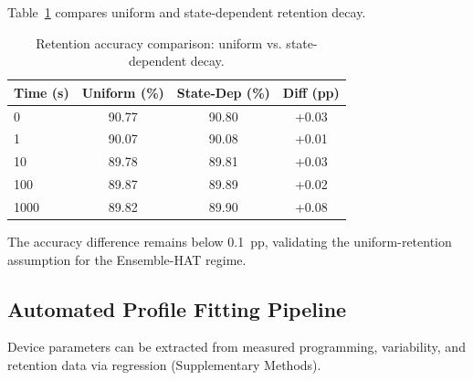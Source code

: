 Table~\ref{deprecated-tab:retention-comparison} compares uniform and state-dependent retention decay.

\begin{table}[ht]
\centering
\caption{Retention accuracy comparison: uniform vs. state-dependent decay.}
\label{deprecated-tab:retention-comparison}
\begin{tabular}{lccc}
\toprule
\textbf{Time (s)} & \textbf{Uniform (\%)} & \textbf{State-Dep (\%)} & \textbf{Diff (pp)} \\
\midrule
0    & 90.77 & 90.80 & +0.03 \\
1    & 90.07 & 90.08 & +0.01 \\
10   & 89.78 & 89.81 & +0.03 \\
100  & 89.87 & 89.89 & +0.02 \\
1000 & 89.82 & 89.90 & +0.08 \\
\bottomrule
\end{tabular}
\end{table}

The accuracy difference remains below 0.1~pp, validating the uniform-retention assumption for the Ensemble-HAT regime.

\FloatBarrier

\subsection{Automated Profile Fitting Pipeline}
\label{deprecated-subsec:auto-fitting}

Device parameters can be extracted from measured programming, variability, and retention data via regression (Supplementary Methods).
